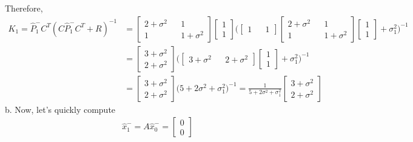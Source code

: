 Therefore,
\begin{align*}
    K_1
    =\hat{P}_1^-C^T(C\hat{P}_1^-C^T+R)^{-1}
    &=
    \begin{bmatrix}
        2+\sigma^2&&1\\1&&1+\sigma^2
    \end{bmatrix}
    \begin{bmatrix}
        1\\1
    \end{bmatrix}
    \Biggl(
        \begin{bmatrix}
            1&&1
        \end{bmatrix}
        \begin{bmatrix}
            2+\sigma^2&&1\\1&&1+\sigma^2
        \end{bmatrix}
        \begin{bmatrix}
            1\\1
        \end{bmatrix}
        +\sigma_1^2
    \Biggr)^{-1}\\
    &=
    \begin{bmatrix}
        3+\sigma^2\\2+\sigma^2
    \end{bmatrix}
    \Biggl(
        \begin{bmatrix}
            3+\sigma^2&&2+\sigma^2
        \end{bmatrix}
        \begin{bmatrix}
            1\\1
        \end{bmatrix}
        +\sigma_1^2
    \Biggr)^{-1}\\
    &=
    \begin{bmatrix}
        3+\sigma^2\\2+\sigma^2
    \end{bmatrix}
    \biggl(
        5+2\sigma^2+\sigma_1^2
    \biggr)^{-1}
    =
    \frac{1}{5+2\sigma^2+\sigma_1^2}
    \begin{bmatrix}
        3+\sigma^2\\2+\sigma^2
    \end{bmatrix}
\end{align*}
b. Now, let's quickly compute
\begin{align*}
    \hat{x}_1^-=A\hat{x}_0^-=
    \begin{bmatrix}
        0\\0
    \end{bmatrix}
\end{align*}
